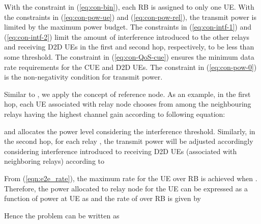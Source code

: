 \documentclass[twocolumn,10pt]{IEEEtran}
\begin{document}
With the constraint in (\ref{eq:con-bin}), each RB is assigned to only one UE. With the constraints in (\ref{eq:con-pow-ue}) and (\ref{eq:con-pow-rel}), the transmit power is limited by the maximum power budget. The constraints in (\ref{eq:con-intf-1}) and (\ref{eq:con-intf-2}) limit the amount of interference introduced to the other relays and receiving D2D UEs in the first and second hop, respectively, to be less than some threshold. The constraint in (\ref{eq:con-QoS-cue}) ensures the minimum data rate requirements for the CUE and D2D UEs. The constraint in (\ref{eq:con-pow-0}) is the non-negativity condition for transmit power.

Similar to \cite{ref_user}, we apply the concept of reference node. As an example, in the first hop, each UE associated with relay node  chooses from among the neighbouring relays having the highest channel gain according to following equation:

and allocates the power level considering the interference threshold. Similarly, in the second hop, for each relay , the transmit power   will be adjusted accordingly considering interference introduced to receiving D2D UEs (associated with neighboring relays) according to 



From (\ref{eqn:e2e_rate}), the maximum rate for the UE  over RB  is achieved when . Therefore, the power allocated to relay node for the UE  can be expressed as a function of power at UE as  and the rate of  over RB  is given by 
  
Hence the problem  can be written as
\end{document}
